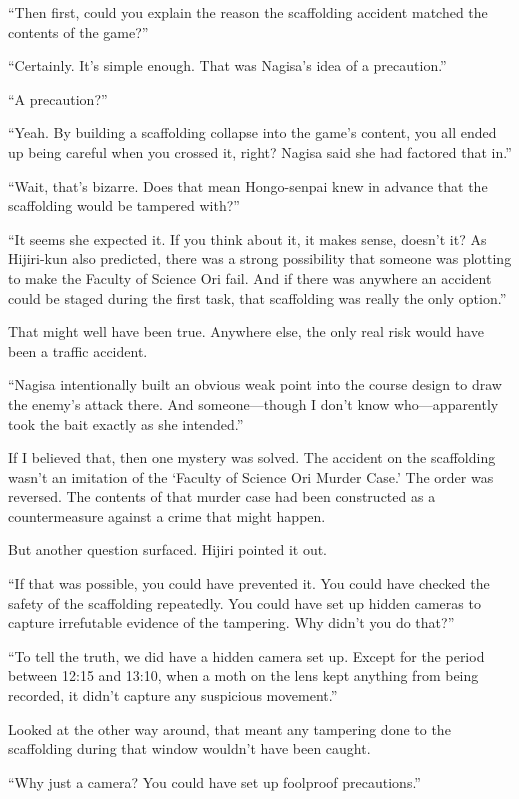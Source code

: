 \documentclass[
    a4paper,
    12pt,
    twoside,
    openany,
    UTF8,
    fontset=windows
]{ctexbook}
\begin{document}
``Then first, could you explain the reason the scaffolding accident matched the contents of the game?''

``Certainly. It's simple enough. That was Nagisa's idea of a precaution.''

``A precaution?''

``Yeah. By building a scaffolding collapse into the game's content, you all ended up being careful when you crossed it, right? Nagisa said she had factored that in.''

``Wait, that's bizarre. Does that mean Hongo-senpai knew in advance that the scaffolding would be tampered with?''

``It seems she expected it. If you think about it, it makes sense, doesn't it? As Hijiri-kun also predicted, there was a strong possibility that someone was plotting to make the Faculty of Science Ori fail. And if there was anywhere an accident could be staged during the first task, that scaffolding was really the only option.''

That might well have been true. Anywhere else, the only real risk would have been a traffic accident.

``Nagisa intentionally built an obvious weak point into the course design to draw the enemy's attack there. And someone---though I don't know who---apparently took the bait exactly as she intended.''

If I believed that, then one mystery was solved. The accident on the scaffolding wasn't an imitation of the `Faculty of Science Ori Murder Case.' The order was reversed. The contents of that murder case had been constructed as a countermeasure against a crime that might happen.

But another question surfaced. Hijiri pointed it out.

``If that was possible, you could have prevented it. You could have checked the safety of the scaffolding repeatedly. You could have set up hidden cameras to capture irrefutable evidence of the tampering. Why didn't you do that?''

``To tell the truth, we did have a hidden camera set up. Except for the period between 12:15 and 13:10, when a moth on the lens kept anything from being recorded, it didn't capture any suspicious movement.''

Looked at the other way around, that meant any tampering done to the scaffolding during that window wouldn't have been caught.

``Why just a camera? You could have set up foolproof precautions.''
\end{document}
